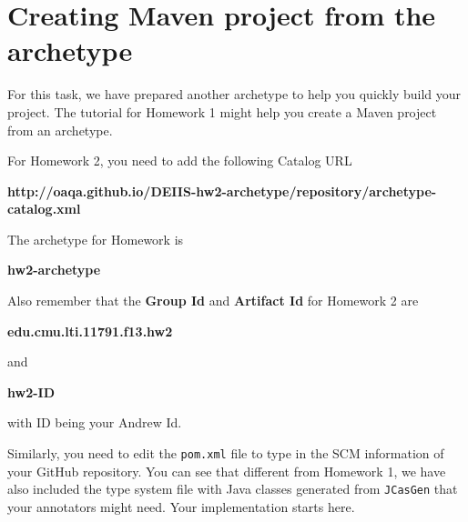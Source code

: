
\section{Creating Maven project from the archetype}

For this task, we have prepared another archetype to help you quickly build your
project. The tutorial for Homework 1 might help you create a Maven project from
an archetype.

For Homework 2, you need to add the following Catalog URL

\begin{center}
\textbf{http://oaqa.github.io/DEIIS-hw2-archetype/repository/archetype-catalog.xml}
\end{center}

The archetype for Homework is

\begin{center}
\textbf{hw2-archetype}
\end{center}

Also remember that the \textbf{Group Id} and \textbf{Artifact Id} for Homework 2
are

\begin{center}
\textbf{edu.cmu.lti.11791.f13.hw2}
\end{center}

and

\begin{center}
\textbf{hw2-ID}
\end{center}

with ID being your Andrew Id.

Similarly, you need to edit the \texttt{pom.xml} file to type in the SCM
information of your GitHub repository. You can see that different from Homework
1, we have also included the type system file with Java classes generated from
\texttt{JCasGen} that your annotators might need. Your implementation starts
here.
